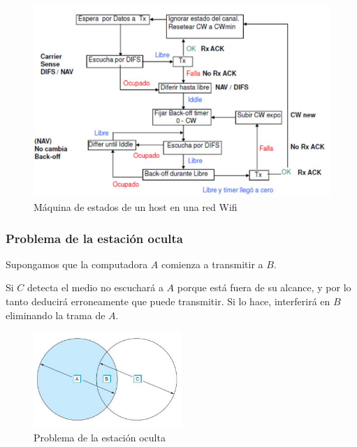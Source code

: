 \begin{figure}[H]
	\centering
	\includegraphics[width=\textwidth
]{images/wifi-estados.jpg}
	\caption[Máquina de estados de un host en una red Wifi]{Máquina de estados de un host en una red Wifi}
	\label{fig:wifi-estados}
\end{figure}

\subsubsection{Problema de la estación oculta}
Supongamos que la computadora \(A\) comienza a transmitir a \(B\). 

Si \(C\) detecta el medio no escuchará a \(A\) porque está fuera de su alcance, y por lo tanto deducirá erroneamente que puede transmitir. Si lo hace, interferirá en \(B\) eliminando la trama de \(A\).

\begin{figure}[H]
	\centering
	\includegraphics[width=0.5\textwidth
]{images/estacion-oculta.jpg}
	\caption[Problema de la estación oculta]{Problema de la estación oculta}
	\label{fig:estacion-oculta}
\end{figure}

